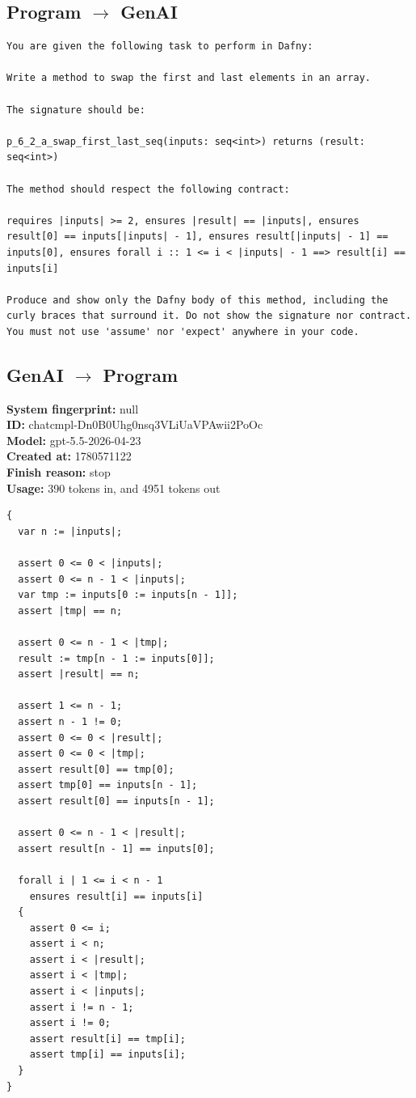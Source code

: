 \documentclass{article}
\begin{document}
\subsection*{Program $\rightarrow$ GenAI}
\begin{lstlisting}
You are given the following task to perform in Dafny:

Write a method to swap the first and last elements in an array.

The signature should be:

p_6_2_a_swap_first_last_seq(inputs: seq<int>) returns (result: seq<int>)

The method should respect the following contract:

requires |inputs| >= 2, ensures |result| == |inputs|, ensures result[0] == inputs[|inputs| - 1], ensures result[|inputs| - 1] == inputs[0], ensures forall i :: 1 <= i < |inputs| - 1 ==> result[i] == inputs[i]

Produce and show only the Dafny body of this method, including the curly braces that surround it. Do not show the signature nor contract. You must not use 'assume' nor 'expect' anywhere in your code.
\end{lstlisting}
\subsection*{GenAI $\rightarrow$ Program}
\textbf{System fingerprint: }null
\\\textbf{ID: }chatcmpl-Dn0B0Uhg0nsq3VLiUaVPAwii2PoOc
\\\textbf{Model: }gpt-5.5-2026-04-23
\\\textbf{Created at: }1780571122
\\\textbf{Finish reason: }stop
\\\textbf{Usage: }390 tokens in, and 4951 tokens out
\begin{lstlisting}
{
  var n := |inputs|;

  assert 0 <= 0 < |inputs|;
  assert 0 <= n - 1 < |inputs|;
  var tmp := inputs[0 := inputs[n - 1]];
  assert |tmp| == n;

  assert 0 <= n - 1 < |tmp|;
  result := tmp[n - 1 := inputs[0]];
  assert |result| == n;

  assert 1 <= n - 1;
  assert n - 1 != 0;
  assert 0 <= 0 < |result|;
  assert 0 <= 0 < |tmp|;
  assert result[0] == tmp[0];
  assert tmp[0] == inputs[n - 1];
  assert result[0] == inputs[n - 1];

  assert 0 <= n - 1 < |result|;
  assert result[n - 1] == inputs[0];

  forall i | 1 <= i < n - 1
    ensures result[i] == inputs[i]
  {
    assert 0 <= i;
    assert i < n;
    assert i < |result|;
    assert i < |tmp|;
    assert i < |inputs|;
    assert i != n - 1;
    assert i != 0;
    assert result[i] == tmp[i];
    assert tmp[i] == inputs[i];
  }
}
\end{lstlisting}
\end{document}
